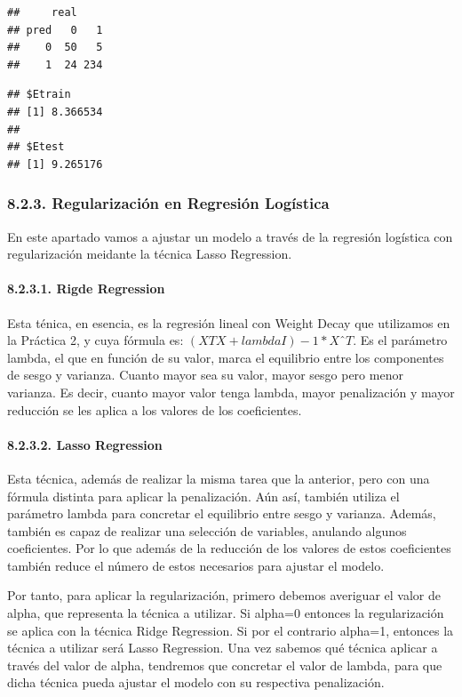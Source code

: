 \documentclass[spanish,]{article}
\let\oldparagraph\paragraph
\renewcommand{\paragraph}[1]{\oldparagraph{#1}\mbox{}}
\begin{document}
\begin{verbatim}
##     real
## pred   0   1
##    0  50   5
##    1  24 234
\end{verbatim}

\begin{verbatim}
## $Etrain
## [1] 8.366534
## 
## $Etest
## [1] 9.265176
\end{verbatim}

\subsubsection{8.2.3. Regularización en Regresión
Logística}\label{regularizacion-en-regresion-logistica}

En este apartado vamos a ajustar un modelo a través de la regresión
logística con regularización meidante la técnica Lasso Regression.

\paragraph{8.2.3.1. Rigde Regression}\label{rigde-regression}

Esta ténica, en esencia, es la regresión lineal con Weight Decay que
utilizamos en la Práctica 2, y cuya fórmula es:
\((XTX + lambdaI)-1 *XˆT\). Es el parámetro lambda, el que en función de
su valor, marca el equilibrio entre los componentes de sesgo y varianza.
Cuanto mayor sea su valor, mayor sesgo pero menor varianza. Es decir,
cuanto mayor valor tenga lambda, mayor penalización y mayor reducción se
les aplica a los valores de los coeficientes.

\paragraph{8.2.3.2. Lasso Regression}\label{lasso-regression}

Esta técnica, además de realizar la misma tarea que la anterior, pero
con una fórmula distinta para aplicar la penalización. Aún así, también
utiliza el parámetro lambda para concretar el equilibrio entre sesgo y
varianza. Además, también es capaz de realizar una selección de
variables, anulando algunos coeficientes. Por lo que además de la
reducción de los valores de estos coeficientes también reduce el número
de estos necesarios para ajustar el modelo.

Por tanto, para aplicar la regularización, primero debemos averiguar el
valor de alpha, que representa la técnica a utilizar. Si alpha=0
entonces la regularización se aplica con la técnica Ridge Regression. Si
por el contrario alpha=1, entonces la técnica a utilizar será Lasso
Regression. Una vez sabemos qué técnica aplicar a través del valor de
alpha, tendremos que concretar el valor de lambda, para que dicha
técnica pueda ajustar el modelo con su respectiva penalización.
\end{document}
